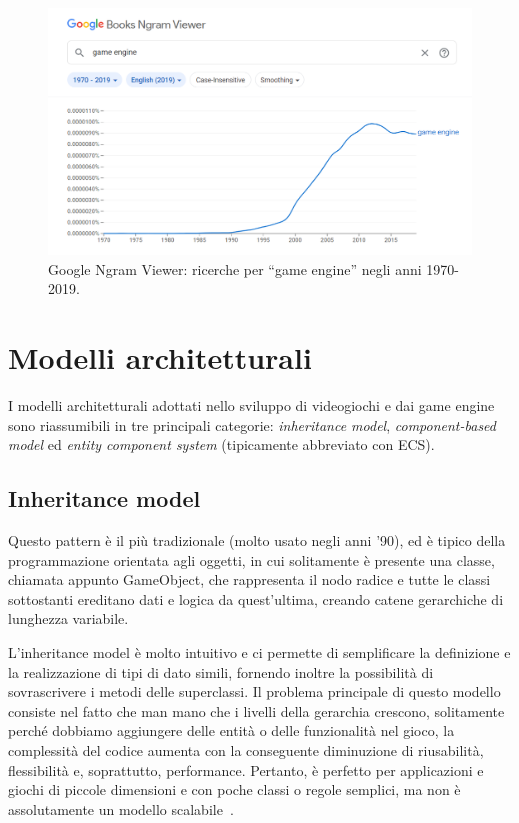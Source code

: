 \begin{figure}[!ht]
    \centering
    \includegraphics[width=0.95\columnwidth]{gfx/imgs/chapter1/GameEngineGoogleSearch.png}
    \caption{Google Ngram Viewer: ricerche per ``game engine'' negli anni 1970-2019.}
    \label{fig:game-engine-google-search}
\end{figure}


\section{Modelli architetturali}
I modelli architetturali adottati nello sviluppo di videogiochi e dai game engine sono riassumibili in tre principali categorie: \emph{inheritance model}, \emph{component-based model} ed \emph{entity component system} (tipicamente abbreviato con ECS).

\subsection{Inheritance model}
Questo pattern è il più tradizionale (molto usato negli anni '90), ed è tipico della programmazione orientata agli oggetti, in cui solitamente è presente una classe, chiamata appunto GameObject, che rappresenta il nodo radice e tutte le classi sottostanti ereditano dati e logica da quest'ultima, creando catene gerarchiche di lunghezza variabile.

L'inheritance model è molto intuitivo e ci permette di semplificare la definizione e la realizzazione di tipi di dato simili, fornendo inoltre la possibilità di sovrascrivere i metodi delle superclassi. Il problema principale di questo modello consiste nel fatto che man mano che i livelli della gerarchia crescono, solitamente perché dobbiamo aggiungere delle entità o delle funzionalità nel gioco, la complessità del codice aumenta con la conseguente diminuzione di riusabilità, flessibilità e, soprattutto, performance. Pertanto, è perfetto per applicazioni e giochi di piccole dimensioni e con poche classi o regole semplici, ma non è assolutamente un modello scalabile~\cite{phd:romeoanalysis}.

